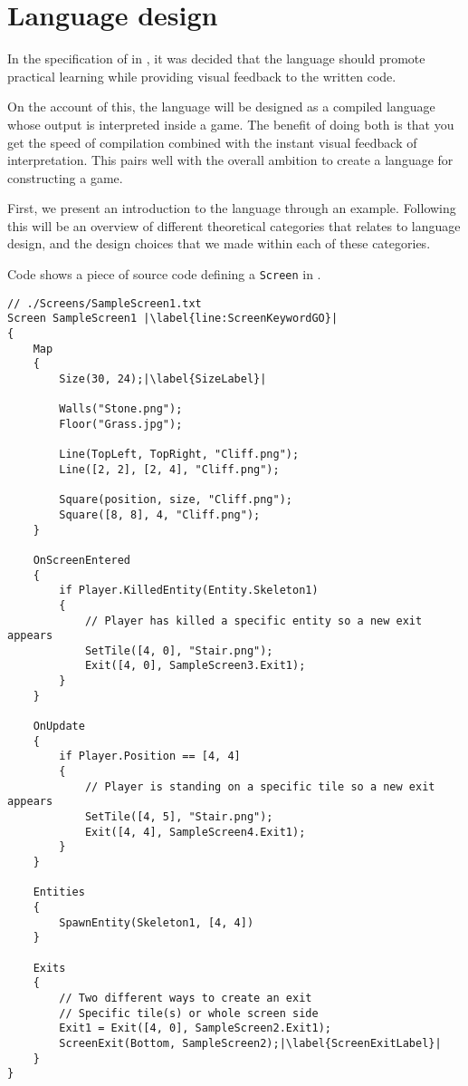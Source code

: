 \chapter{Language design}\label{chap:language_design}
In the specification of \dazel{} in , it was decided that the language should promote practical learning while providing visual feedback to the written code. 

On the account of this, the \dazel{} language will be designed as a compiled language whose output is interpreted inside a game.
The benefit of doing both is that you get the speed of compilation combined with the instant visual feedback of interpretation.
This pairs well with the overall ambition to create a language for constructing a game.

First, we present an introduction to the \dazel{} language through an example. Following this will be an overview of different theoretical categories that relates to language design, and the design choices that we made within each of these categories.


Code  shows a piece of source code defining a \texttt{Screen} in \dazel{}. 

\begin{lstlisting}[language=CSharp, caption={Example screen.}, label={lst:SampleScreen1},escapechar=|]
// ./Screens/SampleScreen1.txt
Screen SampleScreen1 |\label{line:ScreenKeywordGO}|
{
    Map 
    {
        Size(30, 24);|\label{SizeLabel}|

        Walls("Stone.png"); 
        Floor("Grass.jpg");

        Line(TopLeft, TopRight, "Cliff.png");
        Line([2, 2], [2, 4], "Cliff.png");

        Square(position, size, "Cliff.png");
        Square([8, 8], 4, "Cliff.png");
    }

    OnScreenEntered
    {
        if Player.KilledEntity(Entity.Skeleton1) 
        {
            // Player has killed a specific entity so a new exit appears
            SetTile([4, 0], "Stair.png");
            Exit([4, 0], SampleScreen3.Exit1);
        }
    }

    OnUpdate
    {
        if Player.Position == [4, 4] 
        {
            // Player is standing on a specific tile so a new exit appears
            SetTile([4, 5], "Stair.png");
            Exit([4, 4], SampleScreen4.Exit1);
        }
    }

    Entities
    {
        SpawnEntity(Skeleton1, [4, 4])
    }
    
    Exits 
    {
        // Two different ways to create an exit
        // Specific tile(s) or whole screen side
        Exit1 = Exit([4, 0], SampleScreen2.Exit1);
        ScreenExit(Bottom, SampleScreen2);|\label{ScreenExitLabel}|
    }
}
\end{lstlisting}


